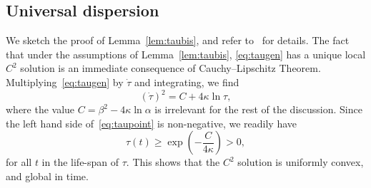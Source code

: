 \subsection{Universal dispersion}

We sketch the proof of Lemma~\ref{lem:taubis}, and refer to~\cite{CaGa18} for details. The fact that under the assumptions of Lemma~\ref{lem:taubis}, \eqref{eq:taugen} has a unique local $C^2$ solution is an immediate consequence of Cauchy--Lipschitz Theorem. Multiplying~\eqref{eq:taugen} by $\dot \tau$ and integrating, we find
\begin{equation}\label{eq:taupoint}
\left(\dot \tau\right)^2 = C+4\kappa \ln \tau,
\end{equation}
where the value $ C= \beta^2 -4\kappa \ln \alpha$ is irrelevant for the rest of the discussion. Since the left hand side of~\eqref{eq:taupoint} is non-negative, we readily have
\begin{equation*}
\tau(t)\ge \exp\left(-\frac{C}{4\kappa}\right)>0,
\end{equation*}
for all $t$ in the life-span of $\tau$. This shows that the $C^2$ solution is uniformly convex, and global in time.

